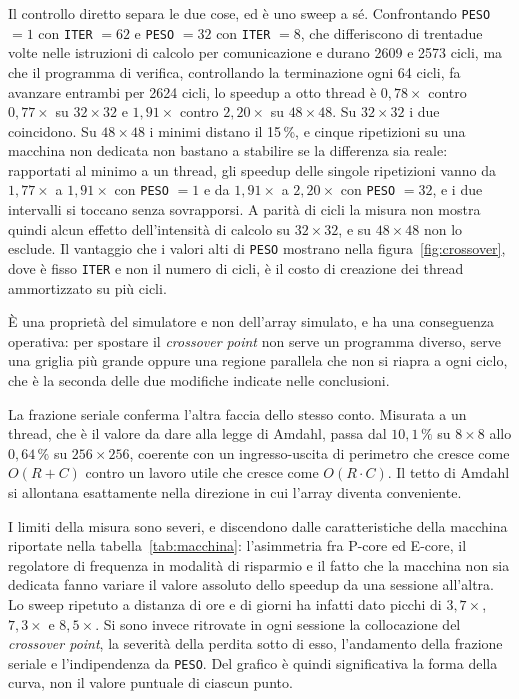 Il controllo diretto separa le due cose, ed è uno sweep a sé. Confrontando
\texttt{PESO} $=1$ con \texttt{ITER} $=62$ e \texttt{PESO} $=32$ con
\texttt{ITER} $=8$, che differiscono di trentadue volte nelle istruzioni di
calcolo per comunicazione e durano 2609 e 2573 cicli, ma che il programma di
verifica, controllando la terminazione ogni 64 cicli, fa avanzare entrambi per
2624 cicli, lo speedup a otto thread è $0{,}78\times$ contro $0{,}77\times$ su $32\times32$ e $1{,}91\times$
contro $2{,}20\times$ su $48\times48$. Su $32\times32$ i due coincidono. Su
$48\times48$ i minimi distano il 15\,\%, e cinque ripetizioni su una macchina
non dedicata non bastano a stabilire se la differenza sia reale: rapportati al
minimo a un thread, gli speedup delle singole ripetizioni vanno da
$1{,}77\times$ a $1{,}91\times$ con \texttt{PESO} $=1$ e da $1{,}91\times$ a
$2{,}20\times$ con \texttt{PESO} $=32$, e i due intervalli si toccano senza
sovrapporsi. A parità di cicli la misura non mostra quindi alcun effetto
dell'intensità di calcolo su $32\times32$, e su $48\times48$ non lo esclude. Il
vantaggio che i valori alti di \texttt{PESO} mostrano nella
figura~\ref{fig:crossover}, dove è fisso \texttt{ITER} e non il numero di cicli,
è il costo di creazione dei thread ammortizzato su più cicli.

È una proprietà del simulatore e non dell'array simulato, e ha una conseguenza
operativa: per spostare il \emph{crossover point} non serve un programma diverso, serve una
griglia più grande oppure una regione parallela che non si riapra a ogni ciclo,
che è la seconda delle due modifiche indicate nelle conclusioni.

La frazione seriale conferma l'altra faccia dello stesso conto. Misurata a un
thread, che è il valore da dare alla legge di Amdahl, passa dal $10{,}1\,\%$ su
$8\times8$ allo $0{,}64\,\%$ su $256\times256$, coerente con un
ingresso-uscita di perimetro che cresce come $O(R+C)$ contro un lavoro utile
che cresce come $O(R \cdot C)$. Il tetto di Amdahl si allontana esattamente nella
direzione in cui l'array diventa conveniente.


I limiti della misura sono severi, e discendono dalle caratteristiche della
macchina riportate nella tabella~\ref{tab:macchina}: l'asimmetria fra P-core ed E-core, il regolatore di frequenza in modalità di
risparmio e il fatto che la macchina non sia dedicata fanno variare il valore
assoluto dello speedup da una sessione all'altra. Lo sweep
ripetuto a distanza di ore e di giorni ha infatti dato picchi di
$3{,}7\times$, $7{,}3\times$ e
$8{,}5\times$. Si sono invece ritrovate in ogni sessione la collocazione del
\emph{crossover point}, la severità della perdita sotto di esso, l'andamento della frazione
seriale e l'indipendenza da \texttt{PESO}. Del grafico è quindi significativa la
forma della curva, non il valore puntuale di ciascun punto.

